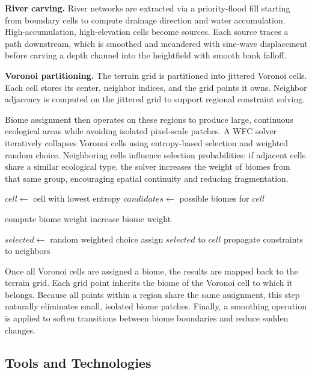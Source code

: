 \documentclass[12pt]{article}
\begin{document}
\textbf{River carving.} River networks are extracted via a priority-flood fill starting from boundary cells to compute drainage direction and water accumulation. High-accumulation, high-elevation cells become sources. Each source traces a path downstream, which is smoothed and meandered with sine-wave displacement before carving a depth channel into the heightfield with smooth bank falloff.

\textbf{Voronoi partitioning.} The terrain grid is partitioned into jittered Voronoi cells. Each cell stores its center, neighbor indices, and the grid points it owns. Neighbor adjacency is computed on the jittered grid to support regional constraint solving.

Biome assignment then operates on these regions to produce large, continuous ecological areas while avoiding isolated pixel-scale patches. A WFC solver iteratively collapses Voronoi cells using entropy-based selection and weighted random choice. Neighboring cells influence selection probabilities: if adjacent cells share a similar ecological type, the solver increases the weight of biomes from that same group, encouraging spatial continuity and reducing fragmentation.

\begin{algorithm}
\caption{Biome Assignment using WFC}
\begin{algorithmic}[1]
    \State $cell \gets$ cell with lowest entropy
    \State $candidates \gets$ possible biomes for $cell$
    
        \State compute biome weight
            \State increase biome weight
        \EndIf
    \EndFor
    
    \State $selected \gets$ random weighted choice
    \State assign $selected$ to $cell$
    \State propagate constraints to neighbors
\EndWhile
\end{algorithmic}
\end{algorithm}

Once all Voronoi cells are assigned a biome, the results are mapped back to the terrain grid. Each grid point inherits the biome of the Voronoi cell to which it belongs. Because all points within a region share the same assignment, this step naturally eliminates small, isolated biome patches. Finally, a smoothing operation is applied to soften transitions between biome boundaries and reduce sudden changes.

\subsection{Tools and Technologies}
\end{document}
